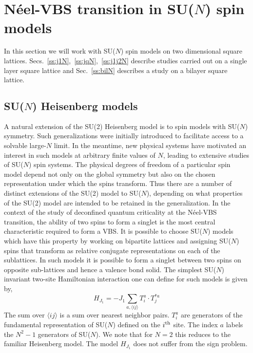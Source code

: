 \documentclass[range]{ar2e}
\begin{document}
\section{N\'eel-VBS transition in SU($N$) spin models}

In this section we will work with SU($N$) spin models on two
dimensional  square
lattices. Secs.~\ref{ss:j1N},~\ref{ss:jqN},~\ref{ss:j1j2N} describe
studies carried out on a single layer square lattice and
Sec.~\ref{ss:bilN} describes a study on a bilayer square
lattice. 

\subsection{SU($N$) Heisenberg models}
\label{sec:sunmodels}

A natural extension of the SU(2) Heisenberg model is to spin models with
SU($N$) symmetry. Such generalizations were initially introduced to
facilitate access to
a solvable large-$N$ limit. In the meantime, new physical systems have
motivated an interest in such models at arbitrary finite values of
$N$, leading to extensive studies of SU($N$) spin systems. The physical degrees of freedom of a particular
spin model depend not only on the global symmetry but also on the
chosen representation under which the spins transform. Thus there are
a number of distinct extensions of the SU(2) model to SU($N$), depending on
what properties of the SU(2) model are intended to be retained in the
generalization. In the context of the study of deconfined quantum criticality at the
N\'eel-VBS transition, the ability of two spins to form a singlet is the most
central characteristic required to form a VBS. It
is possible to choose SU($N$) models which have this property by
working on bipartite lattices and
assigning SU($N$) spins that transform
as relative conjugate representations
 on each of the sublattices. In such models it is possible to form a singlet
between two spins on opposite sub-lattices and hence a valence bond
solid.  The simplest SU($N$) invariant two-site Hamiltonian interaction one can define for
such models is given by,
\begin{equation}
\label{ham:j1}
H_{J_1} = -J_1 \sum_{a,\langle ij\rangle} T^a_i\cdot T^{*a}_j
\end{equation}
The sum over $\langle ij \rangle$ is a sum over nearest neighbor
pairs. $T^a_i$ are generators of the fundamental representation of SU($N$) defined on the
$i^{\rm th}$ site. The index $a$ labels the $N^2-1$ generators of
SU($N$). We note that for $N=2$ this reduces to the familiar
Heisenberg model. The model $H_{J_1}$ does not suffer from the sign
problem.
\end{document}
